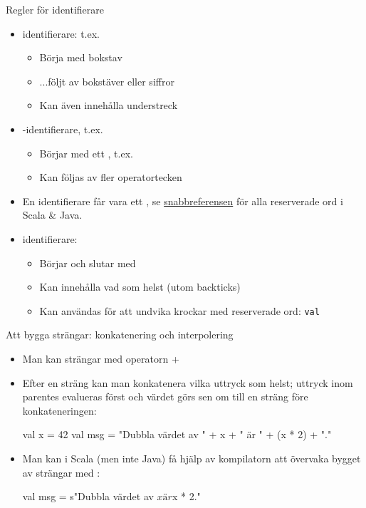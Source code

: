 \documentclass{simpleslides}
\begin{document}
  
  \begin{Slide}{Regler för identifierare}
  \begin{itemize}
  \item {} identifierare: t.ex. 
  \begin{itemize}
  \item Börja med bokstav
  \item ...följt av bokstäver eller siffror
  \item Kan även innehålla understreck
  \end{itemize}
  
  \item {}-identifierare, t.ex. \code{+:}
  \begin{itemize}
  \item Börjar med ett , t.ex. 
  \item Kan följas av fler operatortecken
  \end{itemize}
  
  
  \item En identifierare får  vara ett , se \href{https://fileadmin.cs.lth.se/pgk/quickref.pdf}{snabbreferensen} för alla reserverade ord i Scala \& Java.
  
  \item {} identifierare: 
  \begin{itemize}
  \item Börjar och slutar med   
  \item Kan innehålla vad som helst (utom backticks)
  \item Kan användas för att undvika krockar med reserverade ord: \texttt{val}
  \end{itemize}
  
  \end{itemize}
  \end{Slide}


  \begin{Slide}{Att bygga strängar: konkatenering och interpolering}
    \begin{itemize}
    \item Man kan  strängar med operatorn + \\ 
    \item Efter en sträng kan man konkatenera vilka uttryck som helst; uttryck inom parentes evalueras först och värdet görs sen om till en sträng före konkateneringen:
    \begin{Code}
    val x = 42
    val msg = "Dubbla värdet av " + x + " är " + (x * 2) + "."
    \end{Code}
    \item Man kan i Scala (men inte Java) få hjälp av kompilatorn att övervaka bygget av strängar med  :
    \begin{Code}
    val msg = s"Dubbla värdet av $x är ${x * 2}."
    \end{Code}
    
    \end{itemize}
    \end{Slide}
    
\end{document}

